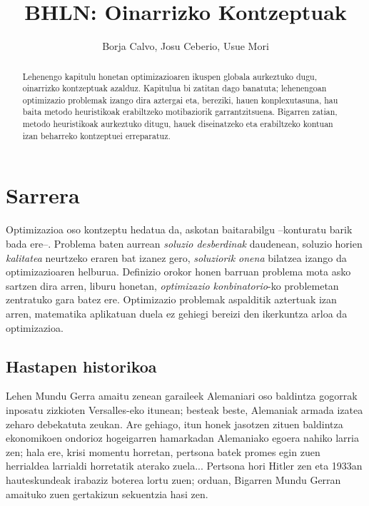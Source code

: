 \documentclass[eu]{ifirak}\usepackage[]{graphicx}\usepackage[]{color}
\begin{document}
\title{BHLN: Oinarrizko Kontzeptuak}
\date{}
\author{Borja Calvo, Josu Ceberio, Usue Mori}







\maketitle

\begin{abstract}
Lehenengo kapitulu honetan optimizazioaren ikuspen globala aurkeztuko dugu, oinarrizko kontzeptuak azalduz. Kapitulua bi zatitan dago banatuta; lehenengoan optimizazio problemak izango dira aztergai eta, bereziki, hauen konplexutasuna, hau baita metodo heuristikoak erabiltzeko motibaziorik garrantzitsuena. Bigarren zatian, metodo heuristikoak aurkeztuko ditugu, hauek diseinatzeko eta erabiltzeko kontuan izan beharreko kontzeptuei erreparatuz.
\end{abstract}

\section{Sarrera}

Optimizazioa oso kontzeptu hedatua da, askotan baitarabilgu --konturatu barik bada ere--. Problema baten aurrean \textit{soluzio desberdinak} daudenean, soluzio horien \textit{kalitatea} neurtzeko eraren bat izanez gero, \textit{soluziorik onena} bilatzea izango da optimizazioaren helburua. Definizio orokor honen barruan problema mota asko sartzen dira arren, liburu honetan, \textit{optimizazio konbinatorio}-ko problemetan zentratuko gara batez ere. Optimizazio problemak aspalditik aztertuak izan arren, matematika aplikatuan duela ez gehiegi bereizi den ikerkuntza arloa da optimizazioa.
 

\subsection{Hastapen historikoa}
Lehen Mundu Gerra amaitu zenean garaileek Alemaniari oso baldintza gogorrak inposatu zizkioten Versalles-eko itunean; besteak beste, Alemaniak armada izatea zeharo debekatuta zeukan. Are gehiago, itun honek jasotzen zituen baldintza ekonomikoen ondorioz hogeigarren hamarkadan Alemaniako egoera nahiko larria zen; hala ere, krisi momentu horretan, pertsona batek promes egin zuen herrialdea larrialdi horretatik aterako zuela... Pertsona hori Hitler zen eta 1933an hauteskundeak irabaziz boterea lortu zuen; orduan, Bigarren Mundu Gerran amaituko zuen gertakizun sekuentzia hasi zen.
\end{document}
